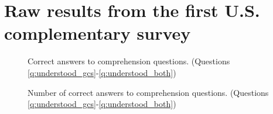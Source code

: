 \clearpage
\section{Raw results from the first U.S. complementary survey}\label{app:raw_results_US1}

\begin{figure}[h!]
    \caption{Correct answers to comprehension questions. (Questions \ref{q:understood_gcs}-\ref{q:understood_both})}\label{fig:understood_each}
\end{figure}

\begin{figure}[h!]
    \caption{Number of correct answers to comprehension questions. (Questions \ref{q:understood_gcs}-\ref{q:understood_both})}\label{fig:understood_score}
\end{figure}



